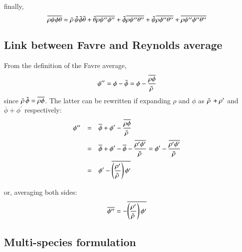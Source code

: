 \documentclass{warpdoc}
\newcommand{\alb}{\vspace{0.2cm}\\} %
\newcommand{\mfd}{\displaystyle}
\begin{document}
%
finally,
%
\begin{equation}
   \mfd\overline{\rho \psi \phi \theta} = \mfd\wbar{\rho}\, {\wtilde{\psi}} {\wtilde{\phi}} \wtilde{\theta}
       +\wtilde{\theta} \overline{\rho \psi^{\prime\prime} \phi^{\prime\prime}}
       +{\wtilde{\phi}} \overline{\rho \psi^{\prime\prime} \theta^{\prime\prime}}
       +{\wtilde{\psi}} \overline{\rho \phi^{\prime\prime} \theta^{\prime\prime}}
       +\overline{\rho \psi^{\prime\prime} \phi^{\prime\prime} \theta^{\prime\prime}}
  \label{eqn:favre-mult-3term}
\end{equation}
%

\subsection{Link between Favre and Reynolds average}

From the definition of the Favre average,
%
\begin{equation}
  \phi^{\prime\prime} = \phi-{\tilde{\phi}} = \phi-\frac{\overline{\rho  \phi}}{\bar{\rho}\,}
\end{equation}
%
since $\bar{\rho}\, {\tilde{\phi}} = \overline{\rho  \phi}$.
The latter can be rewritten if expanding $\rho$ and $\phi$ as
$\bar{\rho}\,+\rho^{\prime}$ and $\overline{\phi}+\phi^{\prime}$ respectively:
%
\begin{equation}
  \begin{array}{rcl}
  \phi^{\prime\prime} &=&\mfd\overline{\phi}+\phi^{\prime}-\frac{\overline{\rho  \phi}}{\wbar{\rho}\,} \alb
           &=&\mfd\overline{\phi}+\phi^{\prime}-\overline{\phi}-\frac{\overline{\rho^{\prime}  \phi^{\prime}}}{\wbar{\rho}\,}
           = \mfd\phi^{\prime}-\frac{\overline{\rho^{\prime}  \phi^{\prime}}}{\wbar{\rho}\,} \alb
           &=&\mfd\phi^{\prime}-\overline{\left(\frac{\rho^{\prime}}{\wbar{\rho}\,}\right) \phi^{\prime}} \alb
  \end{array}
\end{equation}
%
or, averaging both sides:
%
\begin{equation}
  \overline{\phi^{\prime\prime}} = -\overline{\left(\frac{\rho^{\prime}}{\bar{\rho}\,}\right) \phi^{\prime}}
\end{equation}
%


\subsection{Multi-species formulation}
\end{document}
